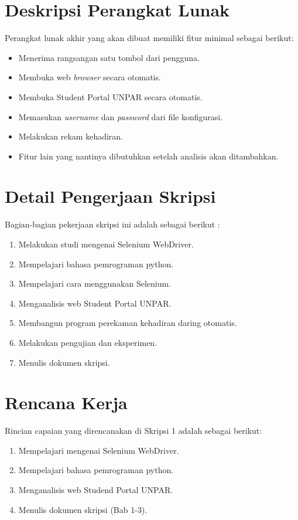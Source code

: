 \documentclass[a4paper,twoside]{article}
\begin{document}
\section{Deskripsi Perangkat Lunak}
Perangkat lunak akhir yang akan dibuat memiliki fitur minimal sebagai berikut:
\begin{itemize}
	\item Menerima rangsangan satu tombol dari pengguna.
	\item Membuka web \textit{browser} secara otomatis.
	\item Membuka Student Portal UNPAR secara otomatis.
	\item Memasukan \textit{username} dan \textit{password} dari file konfigurasi.
	\item Melakukan rekam kehadiran.
	\item Fitur lain yang nantinya dibutuhkan setelah analisis akan ditambahkan. 
\end{itemize}

\section{Detail Pengerjaan Skripsi}
Bagian-bagian pekerjaan skripsi ini adalah sebagai berikut :
	\begin{enumerate}
		\item Melakukan studi mengenai Selenium WebDriver.
		\item Mempelajari bahasa pemrograman python.
		\item Mempelajari cara menggunakan Selenium.
		\item Menganalisis web Student Portal UNPAR.
		\item Membangun program perekaman kehadiran daring otomatis.
		\item Melakukan pengujian dan eksperimen.
		\item Menulis dokumen skripsi.		
	\end{enumerate}

\section{Rencana Kerja}
Rincian capaian yang direncanakan di Skripsi 1 adalah sebagai berikut:
\begin{enumerate}
\item Mempelajari mengenai Selenium WebDriver.
\item Mempelajari bahasa pemrograman python.
\item Menganalisis web Studend Portal UNPAR.
\item Menulis dokumen skripsi (Bab 1-3).
\end{enumerate}
\end{document}
